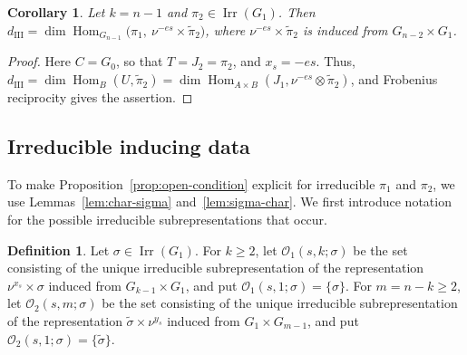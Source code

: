 \documentclass[11pt]{amsart}
\numberwithin{equation}{section}
\theoremstyle{plain}
\newtheorem{corollary}[theorem]{Corollary}
\theoremstyle{definition}
\newtheorem{definition}[theorem]{Definition}
\theoremstyle{remark}
\DeclareMathOperator{\Hom}{Hom}
\DeclareMathOperator{\Irr}{Irr}
\newcommand{\dIII}{d_{\mathrm{III}}}
\begin{document}
\begin{corollary}\label{cor:dIII-kn1}
	Let $k=n-1$ and $\pi_2\in\Irr(G_1)$. Then $\dIII=\dim\Hom_{G_{n-1}}\big(\pi_1,\ \nu^{-es}\times\widetilde\pi_2\big)$, where $\nu^{-es}\times\widetilde\pi_2$ is induced from $G_{n-2}\times G_1$.
\end{corollary}

\begin{proof}
	Here $C=G_0$, so that $T=J_2=\pi_2$, and $x_s=-es$. Thus, $\dIII=\dim\Hom_B(U,\widetilde\pi_2)=\dim\Hom_{A\times B}(J_1,\nu^{-es}\otimes\widetilde\pi_2)$, and Frobenius reciprocity gives the assertion.
\end{proof}

\subsection{Irreducible inducing data}\label{ss:irreducible-data}

To make Proposition~\ref{prop:open-condition} explicit for irreducible $\pi_1$ and $\pi_2$, we use Lemmas~\ref{lem:char-sigma} and~\ref{lem:sigma-char}. We first introduce notation for the possible irreducible subrepresentations that occur.

\begin{definition}\label{def:O-sets}
	Let $\sigma\in\Irr(G_1)$. For $k\ge2$, let $\mathcal O_1(s,k;\sigma)$ be the set consisting of the unique irreducible subrepresentation of the representation $\nu^{x_s}\times\sigma$ induced from $G_{k-1}\times G_1$, and put $\mathcal O_1(s,1;\sigma)=\{\sigma\}$. For $m=n-k\ge2$, let $\mathcal O_2(s,m;\sigma)$ be the set consisting of the unique irreducible subrepresentation of the representation $\widetilde\sigma\times\nu^{y_s}$ induced from $G_1\times G_{m-1}$, and put $\mathcal O_2(s,1;\sigma)=\{\widetilde\sigma\}$.
\end{definition}
\end{document}
